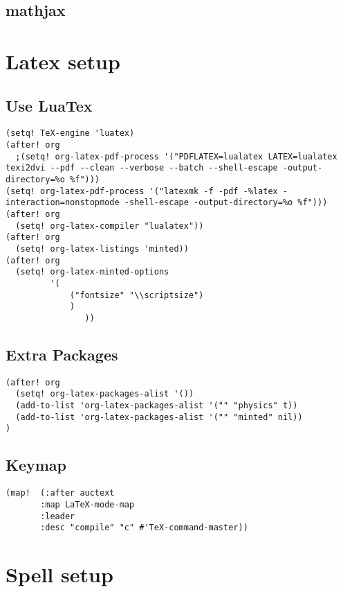 \documentclass[11pt]{article}
\begin{document}
\subsection*{mathjax}
\label{sec:org34bc6b7}

\section*{Latex setup}
\label{sec:org54fce2a}
\subsection*{Use LuaTex}
\label{sec:org57cfc36}
\begin{verbatim}
(setq! TeX-engine 'luatex)
(after! org
  ;(setq! org-latex-pdf-process '("PDFLATEX=lualatex LATEX=lualatex texi2dvi --pdf --clean --verbose --batch --shell-escape -output-directory=%o %f")))
(setq! org-latex-pdf-process '("latexmk -f -pdf -%latex -interaction=nonstopmode -shell-escape -output-directory=%o %f")))
(after! org
  (setq! org-latex-compiler "lualatex"))
(after! org
  (setq! org-latex-listings 'minted))
(after! org
  (setq! org-latex-minted-options
         '(
             ("fontsize" "\\scriptsize")
             )
                ))
\end{verbatim}
\subsection*{Extra Packages}
\label{sec:org253b744}
\begin{verbatim}
(after! org
  (setq! org-latex-packages-alist '())
  (add-to-list 'org-latex-packages-alist '("" "physics" t))
  (add-to-list 'org-latex-packages-alist '("" "minted" nil))
)
\end{verbatim}

\subsection*{Keymap}
\label{sec:org248e21a}
\begin{verbatim}
(map!  (:after auctext
       :map LaTeX-mode-map
       :leader
       :desc "compile" "c" #'TeX-command-master))
\end{verbatim}

\section*{Spell setup}
\label{sec:orgb972ac9}
\end{document}
